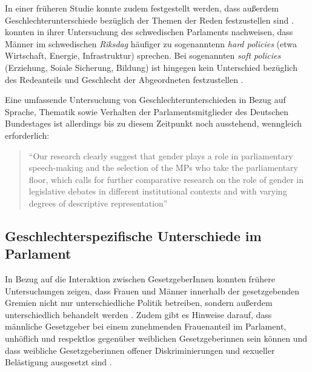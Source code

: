 \documentclass[12pt, 
    twoside=false, 
    bibliography=totoc, 
    numbers=endperiod, 
    headings=normal, 
    toc=chapterentrydotfill
    ]{scrbook}
\begin{document}
In einer früheren Studie konnte zudem festgestellt werden, dass außerdem Geschlechterunterschiede bezüglich der Themen der Reden festzustellen sind \parencite[514f.]{back_2014}. \textcite{back_2014} konnten in ihrer Untersuchung des schwedischen Parlaments nachweisen, dass Männer im schwedischen \emph{Riksdag} häufiger zu sogenanntenn \emph{hard policies} (etwa Wirtschaft, Energie, Infrastruktur) sprechen. Bei sogenannten \emph{soft policies} (Erziehung, Soiale Sicherung, Bildung) ist hingegen kein Unterschied bezüglich des Redeanteils und Geschlecht der Abgeordneten festzustellen \parencite[514f.]{back_2014}. 

Eine umfassende Untersuchung von Geschlechterunterschieden in Bezug auf Sprache, Thematik sowie Verhalten der Parlamentsmitglieder des Deutschen Bundestages ist allerdings bis zu diesem Zeitpunkt noch ausstehend, wenngleich erforderlich: 

\citereset
\begin{quote}
 \enquote{Our research clearly suggest that gender plays a role in parliamentary speech-making and the selection of the MPs who take the parliamentary floor, which calls for further comparative research on the role of gender in legislative  debates in different institutional contexts and with varying degrees of descriptive representation}
  \parencite[515]{back_2014}
\end{quote}


\subsection{Geschlechterspezifische Unterschiede im Parlament}



In Bezug auf die Interaktion zwischen GesetzgeberInnen konnten frühere Untersuchungen zeigen, dass Frauen und Männer innerhalb der gesetzgebenden Gremien nicht nur unterschiedliche Politik betreiben, sondern außerdem unterschiedlich behandelt werden \parencites[201]{erikson_2018}{childs_2004}. Zudem gibt es Hinweise darauf, dass männliche Gesetzgeber bei einem zunehmenden Frauenanteil im Parlament, unhöflich und respektlos gegenüber weiblichen Gesetzgeberinnen sein können \parencites[201]{erikson_2018}{kathlene_1994}{kathlene_2004} und dass weibliche Gesetzgeberinnen offener Diskriminierungen und sexueller Belästigung ausgesetzt sind \parencites[201]{erikson_2018}[76]{lovenduski_2005}{Lovenduski_2004}.
\end{document}
